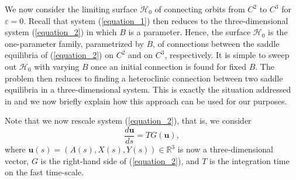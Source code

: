 \documentclass{ws-ijbc}
\begin{document}
We now consider the limiting surface $\mathscr{H}_0$ of connecting orbits from $C^2$ to $C^3$ for $\varepsilon = 0$.  Recall that system (\ref{equation_1}) then reduces to the three-dimensional system (\ref{equation_2}) in which $B$ is a parameter.  Hence, the surface $\mathscr{H}_0$ is the one-parameter family, parametrized by $B$, of connections between the saddle equilibria of (\ref{equation_2}) on $C^2$ and on $C^3$, respectively.  It is simple to sweep out $\mathscr{H}_0$ with varying $B$ once an initial connection is found for fixed $B$.  The problem then reduces to finding a heteroclinic connection between two saddle equilibria in a three-dimensional system.  This is exactly the situation addressed in \cite{Lin,Red_book} and we now briefly explain how this approach can be used for our purposes.

Note that we now rescale system (\ref{equation_2}), that is, we consider
\begin{equation}
\frac{d\mathbf{u}}{ds} = TG(\mathbf{u}),
\label{fast_rescale}
\end{equation}
where $\mathbf{u}(s) = (A(s), X(s), Y(s)) \in \mathbb{R}^3$ is now a three-dimensional vector, $G$ is the right-hand side of (\ref{equation_2}), and $T$ is the integration time on the fast time-scale.
\end{document}
